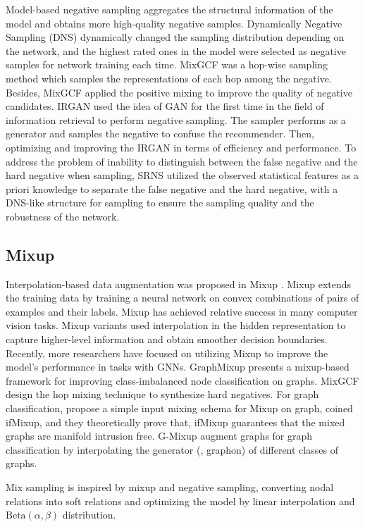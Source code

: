 Model-based negative sampling aggregates the structural information of the model and obtains more high-quality negative samples. Dynamically Negative Sampling (DNS) \cite{zhang2013optimizing} dynamically changed the sampling distribution depending on the network, and the highest rated ones in the model were selected as negative samples for network training each time. MixGCF \cite{huang2021mixgcf} was a hop-wise sampling method which samples the representations of each hop among the negative. Besides, MixGCF applied the positive mixing to improve the quality of negative candidates. IRGAN \cite{wang2017irgan} used the idea of GAN for the first time in the field of information retrieval to perform negative sampling. The sampler performs as a generator and samples the negative to confuse the recommender. Then, \cite{ding2019reinforced, park2019adversarial} optimizing and improving the IRGAN in terms of efficiency and performance. To address the problem of inability to distinguish between the false negative and the hard negative when sampling, SRNS \cite{ding2020simplify} utilized the observed statistical features as a priori knowledge to separate the false negative and the hard negative, with a DNS-like structure for sampling to ensure the sampling quality and the robustness of the network.

\subsection{Mixup}

Interpolation-based data augmentation was proposed in Mixup \cite{mixup}. Mixup extends the training data by training a neural network on convex combinations of pairs of examples and their labels. Mixup has achieved relative success in many computer vision tasks. Mixup variants\cite{manifold,wordmixup,xie2022global} used interpolation in the hidden representation to capture higher-level information and obtain smoother decision boundaries. Recently, more researchers have focused on utilizing Mixup to improve the model’s performance in tasks with GNNs. GraphMixup\cite{wu2021graphmixup} presents a mixup-based framework for improving class-imbalanced node classification on graphs. MixGCF \cite{huang2021mixgcf} design the hop mixing technique to synthesize hard negatives. For graph classification, \cite{guo2021ifmixup} propose a simple input mixing schema for Mixup on graph, coined ifMixup, and they theoretically prove that, ifMixup guarantees that the mixed graphs are manifold intrusion free. G-Mixup augment graphs for graph classification by interpolating the generator (\ie, graphon) of different classes of graphs.

Mix sampling is inspired by mixup and negative sampling, converting nodal relations into soft relations and optimizing the model by linear interpolation and $\text{Beta}(\alpha,\beta)$ distribution.